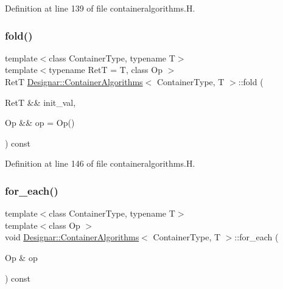 Definition at line 139 of file containeralgorithms.\+H.

\mbox{\label{class_designar_1_1_container_algorithms_a9ff56a438586390aaf72aa2fda0f86e7}} 
\subsubsection{\texorpdfstring{fold()}{fold()}\hspace{0.1cm}{\footnotesize\ttfamily [4/4]}}
{\footnotesize\ttfamily template$<$class Container\+Type, typename T$>$ \\
template$<$typename RetT  = T, class Op $>$ \\
RetT \hyperlink{class_designar_1_1_container_algorithms}{Designar\+::\+Container\+Algorithms}$<$ Container\+Type, T $>$\+::fold (\begin{DoxyParamCaption}\item[{RetT \&\&}]{init\+\_\+val,  }\item[{Op \&\&}]{op = {\ttfamily Op()} }\end{DoxyParamCaption}) const\hspace{0.3cm}{\ttfamily [inline]}}



Definition at line 146 of file containeralgorithms.\+H.

\mbox{\label{class_designar_1_1_container_algorithms_a32b1ccc6fc97faf17064b55e9224ba32}} 
\subsubsection{\texorpdfstring{for\+\_\+each()}{for\_each()}\hspace{0.1cm}{\footnotesize\ttfamily [1/2]}}
{\footnotesize\ttfamily template$<$class Container\+Type, typename T$>$ \\
template$<$class Op $>$ \\
void \hyperlink{class_designar_1_1_container_algorithms}{Designar\+::\+Container\+Algorithms}$<$ Container\+Type, T $>$\+::for\+\_\+each (\begin{DoxyParamCaption}\item[{Op \&}]{op }\end{DoxyParamCaption}) const\hspace{0.3cm}{\ttfamily [inline]}}




